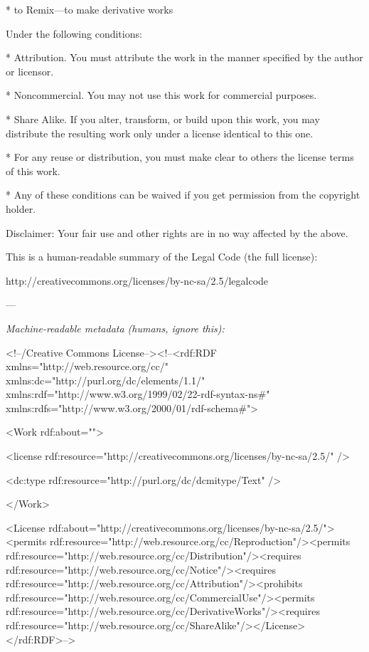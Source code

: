 * to Remix—to make derivative works

Under the following conditions:

* Attribution. You must attribute the work in the manner specified
by the author or licensor.

* Noncommercial. You may not use this work for commercial
purposes.

* Share Alike. If you alter, transform, or build upon this work,
you may distribute the resulting work only under a license
identical to this one.



* For any reuse or distribution, you must make clear to others the
license terms of this work.

* Any of these conditions can be waived if you get permission from
the copyright holder.

Disclaimer: Your fair use and other rights are in no way affected
by the above.

This is a human-readable summary of the Legal Code (the full
license):

http://creativecommons.org/licenses/by-nc-sa/2.5/legalcode

—

\emph{Machine-readable metadata (humans, ignore this):}

\textless{}!--/Creative Commons
License--\textgreater{}\textless{}!--\textless{}rdf:RDF
xmlns="http://web.resource.org/cc/"
xmlns:dc="http://purl.org/dc/elements/1.1/"
xmlns:rdf="http://www.w3.org/1999/02/22-rdf-syntax-ns\#"
xmlns:rdfs="http://www.w3.org/2000/01/rdf-schema\#"\textgreater{}

\textless{}Work rdf:about=""\textgreater{}

\textless{}license
rdf:resource="http://creativecommons.org/licenses/by-nc-sa/2.5/"
/\textgreater{}

\textless{}dc:type rdf:resource="http://purl.org/dc/dcmitype/Text"
/\textgreater{}

\textless{}/Work\textgreater{}

\textless{}License
rdf:about="http://creativecommons.org/licenses/by-nc-sa/2.5/"\textgreater{}\textless{}permits
rdf:resource="http://web.resource.org/cc/Reproduction"/\textgreater{}\textless{}permits
rdf:resource="http://web.resource.org/cc/Distribution"/\textgreater{}\textless{}requires
rdf:resource="http://web.resource.org/cc/Notice"/\textgreater{}\textless{}requires
rdf:resource="http://web.resource.org/cc/Attribution"/\textgreater{}\textless{}prohibits
rdf:resource="http://web.resource.org/cc/CommercialUse"/\textgreater{}\textless{}permits
rdf:resource="http://web.resource.org/cc/DerivativeWorks"/\textgreater{}\textless{}requires
rdf:resource="http://web.resource.org/cc/ShareAlike"/\textgreater{}\textless{}/License\textgreater{}\textless{}/rdf:RDF\textgreater{}--\textgreater{}

